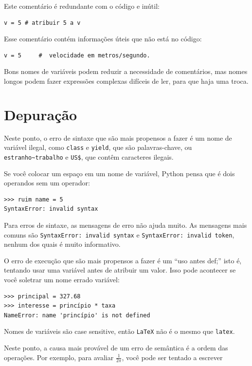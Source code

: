 \documentclass[10pt]{book}
\begin{document}
Este comentário é redundante com o código e inútil:

\begin{verbatim}
v = 5 # atribuir 5 a v
\end{verbatim}
%
Esse comentário contém informações úteis que não está no código:

\begin{verbatim}
v = 5     #  velocidade em metros/segundo. 
\end{verbatim}
%
Bons nomes de variáveis ​​podem reduzir a necessidade de comentários, mas
nomes longos podem fazer expressões complexas difíceis de ler, para que haja
uma troca.


\section{Depuração}

Neste ponto, o erro de sintaxe que são mais propensos a fazer é
um nome de variável ilegal, como {\tt class} e {\tt yield}, que
são palavras-chave, ou \verb"estranho~trabalho" e \verb"US$", que contêm
caracteres ilegais.

Se você colocar um espaço em um nome de variável, Python pensa que é dois
operandos sem um operador:

\begin{verbatim}
>>> ruim name = 5
SyntaxError: invalid syntax
\end{verbatim}
%
Para erros de sintaxe, as mensagens de erro não ajuda muito.
As mensagens mais comuns são {\tt SyntaxError: invalid syntax} e
{\tt SyntaxError: invalid token}, nenhum dos quais é muito informativo.

O erro de execução que são mais propensos a fazer é um ``uso antes
def;'' isto é, tentando usar uma variável antes de atribuir
um valor. Isso pode acontecer se você soletrar um nome errado variável:

\begin{verbatim}
>>> principal = 327.68
>>> interesse = princípio * taxa
NameError: name 'princípio' is not defined
\end{verbatim}
%
Nomes de variáveis ​​são case sensitive, então {\tt LaTeX} não é o
mesmo que {\tt latex}.

Neste ponto, a causa mais provável de um erro de semântica é
a ordem das operações. Por exemplo, para avaliar
 $\frac{1}{2 \pi}$,
você pode ser tentado a escrever
\end{document}
